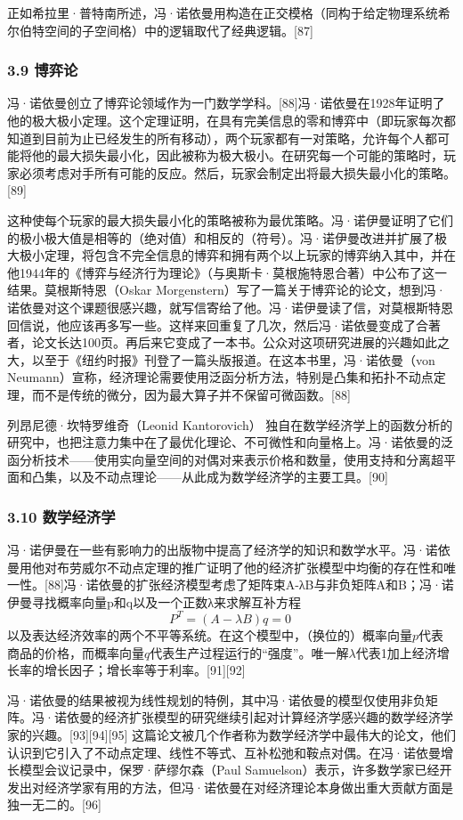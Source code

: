 正如希拉里·普特南所述，冯·诺依曼用构造在正交模格（同构于给定物理系统希尔伯特空间的子空间格）中的逻辑取代了经典逻辑。[87]
\subsubsection{3.9 博弈论}
冯·诺依曼创立了博弈论领域作为一门数学学科。[88]冯·诺依曼在1928年证明了他的极大极小定理。这个定理证明，在具有完美信息的零和博弈中（即玩家每次都知道到目前为止已经发生的所有移动），两个玩家都有一对策略，允许每个人都可能将他的最大损失最小化，因此被称为极大极小。在研究每一个可能的策略时，玩家必须考虑对手所有可能的反应。然后，玩家会制定出将最大损失最小化的策略。[89]

这种使每个玩家的最大损失最小化的策略被称为最优策略。冯·诺伊曼证明了它们的极小极大值是相等的（绝对值）和相反的（符号）。冯·诺伊曼改进并扩展了极大极小定理，将包含不完全信息的博弈和拥有两个以上玩家的博弈纳入其中，并在他1944年的《博弈与经济行为理论》（与奥斯卡·莫根施特恩合著）中公布了这一结果。莫根斯特恩（Oskar Morgenstern）写了一篇关于博弈论的论文，想到冯·诺依曼对这个课题很感兴趣，就写信寄给了他。冯·诺伊曼读了信，对莫根斯特恩回信说，他应该再多写一些。这样来回重复了几次，然后冯·诺依曼变成了合著者，论文长达100页。再后来它变成了一本书。公众对这项研究进展的兴趣如此之大，以至于《纽约时报》刊登了一篇头版报道。在这本书里，冯·诺依曼（von Neumann）宣称，经济理论需要使用泛函分析方法，特别是凸集和拓扑不动点定理，而不是传统的微分，因为最大算子并不保留可微函数。[88]

列昂尼德·坎特罗维奇（Leonid Kantorovich） 独自在数学经济学上的函数分析的研究中，也把注意力集中在了最优化理论、不可微性和向量格上。冯·诺依曼的泛函分析技术——使用实向量空间的对偶对来表示价格和数量，使用支持和分离超平面和凸集，以及不动点理论——从此成为数学经济学的主要工具。[90]
\subsubsection{3.10 数学经济学}
冯·诺伊曼在一些有影响力的出版物中提高了经济学的知识和数学水平。冯·诺依曼用他对布劳威尔不动点定理的推广证明了他的经济扩张模型中均衡的存在性和唯一性。[88]冯·诺依曼的扩张经济模型考虑了矩阵束A-λB与非负矩阵A和B；冯·诺伊曼寻找概率向量p和q以及一个正数λ来求解互补方程
$$P^T=(A-\lambda B)q=0~$$
以及表达经济效率的两个不平等系统。在这个模型中，（换位的）概率向量$p$代表商品的价格，而概率向量$q$代表生产过程运行的“强度”。唯一解$\lambda$代表1加上经济增长率的增长因子；增长率等于利率。[91][92]

冯·诺依曼的结果被视为线性规划的特例，其中冯·诺依曼的模型仅使用非负矩阵。冯·诺依曼的经济扩张模型的研究继续引起对计算经济学感兴趣的数学经济学家的兴趣。[93][94][95] 这篇论文被几个作者称为数学经济学中最伟大的论文，他们认识到它引入了不动点定理、线性不等式、互补松弛和鞍点对偶。在冯·诺依曼增长模型会议记录中，保罗·萨缪尔森（Paul Samuelson）表示，许多数学家已经开发出对经济学家有用的方法，但冯·诺依曼在对经济理论本身做出重大贡献方面是独一无二的。[96]

